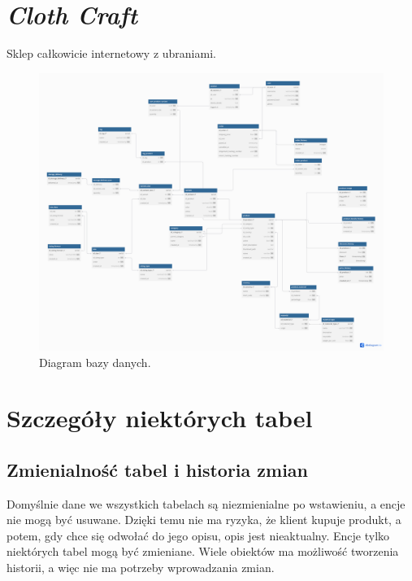 




\section*{\textit{Cloth Craft}}

Sklep całkowicie internetowy z ubraniami.

\begin{figure}[h] %
    \centering %
    \includegraphics[width=1.0\textwidth]{diagram.png} %
    \caption{Diagram bazy danych.} %
    \label{fig:example} %
\end{figure}

\section*{Szczegóły niektórych tabel}

\subsection*{Zmienialność tabel i historia zmian}
Domyślnie dane we wszystkich tabelach są niezmienialne po wstawieniu, a encje nie mogą być usuwane. Dzięki temu nie ma ryzyka, że klient kupuje produkt, a potem, gdy chce się odwołać do jego opisu, opis jest nieaktualny. Encje tylko niektórych tabel mogą być zmieniane. Wiele obiektów ma możliwość tworzenia historii, a więc nie ma potrzeby wprowadzania zmian.

